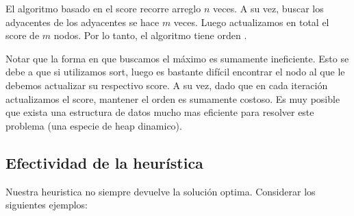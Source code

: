 El algoritmo basado en el score recorre arreglo $n$ veces. A su vez, buscar los adyacentes de los adyacentes se hace $m$ veces. Luego actualizamos en total el score de $m$ nodos. Por lo tanto, el algoritmo tiene orden .

Notar que la forma en que buscamos el máximo es sumamente ineficiente. Esto se debe a que si utilizamos sort, luego es bastante difícil encontrar el nodo al que le debemos actualizar su respectivo score. A su vez, dado que en cada iteración actualizamos el score, mantener el orden es sumamente costoso. Es muy posible que exista una estructura de datos mucho mas eficiente para resolver este problema (una especie de heap dinamico).

\subsection{Efectividad de la heurística}

Nuestra heuristica no siempre devuelve la solución optima. Considerar los siguientes ejemplos:

